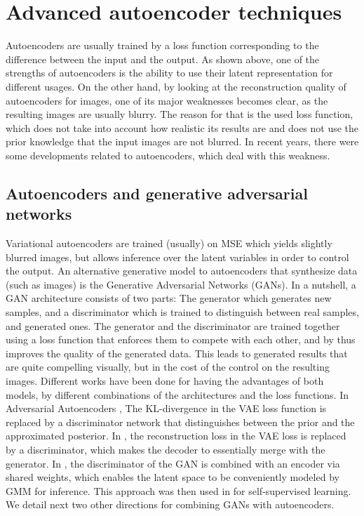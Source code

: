 \documentclass[graybox]{svmult}
\begin{document}
\section{Advanced autoencoder techniques}
\label{sec:Advanced_autoencoder_techniques}
Autoencoders are usually trained by a loss function corresponding to the difference between the input and the output. As shown above, one of the strengths of autoencoders is the ability to use their latent representation for different usages. On the other hand, by looking at the reconstruction quality of autoencoders for images, one of its major weaknesses becomes clear, as the resulting images are usually blurry. The reason for that is the used loss function, which does not take into account how realistic its results are and does not use the prior knowledge that the input images are not blurred. In recent years, there were some developments related to autoencoders, which deal with this weakness.



\subsection{Autoencoders and generative adversarial networks}
\label{sec:autoencoders_and_generative_adversarial_networks}
Variational autoencoders are trained (usually) on MSE which yields slightly blurred images, but allows inference over the latent variables in order to control the output.
An alternative generative model to autoencoders that synthesize data (such as images) is the Generative Adversarial Networks (GANs). In a nutshell, a GAN architecture consists of two parts: The generator  which generates new samples, and a discriminator which is trained to distinguish between real samples, and generated ones. The generator and the discriminator are trained together using a loss function that enforces them to compete with each other, and by thus improves the quality of the generated data. This leads to generated results that are quite compelling visually, but in the cost of the control on the resulting images.
Different works have been done for having the advantages of both models, by different combinations of the architectures and the loss functions.
In Adversarial Autoencoders \cite{Adversarial_Autoencoders}, The KL-divergence in the VAE loss function is replaced by a discriminator network that distinguishes between the prior and the approximated posterior. In \cite{decoder_generator}, the reconstruction loss in the VAE loss is replaced by a discriminator, which makes the decoder to essentially merge with the generator. In \cite{GAEL}, the discriminator of the GAN is combined with an encoder via shared weights, which enables the latent space to be conveniently modeled by GMM for inference. This approach was then used in \cite{StyleGANEncoder} for self-supervised learning. 
We detail next two other directions for combining GANs with autoencoders.
\end{document}
